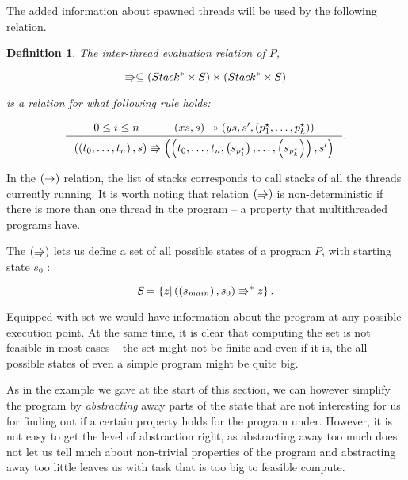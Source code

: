 \documentclass[..thesis.tex]{subfiles}
\newtheorem{defin}{Definition}[section]
\begin{document}

The added information about spawned threads will be used by the following relation.

\begin{defin}

  The inter-thread evaluation relation of $P$, 
 
  \begin{equation*}
    \Rrightarrow \subseteq \left( Stack^\ast \times S \right) \times \left( Stack^\ast \times S \right)
  \end{equation*}

  is a relation for what following rule holds:   

  \begin{equation*}
    \inference{ 0 \leq i \leq n  \separ \lp xs , s \rp \intrathread \lp ys, s', \lp p_1^\star, \ldots, p_k^{\star} \rp \rp}{ \lp \lp t_0, \ldots, t_n \rp, s \rp \interthread  \lp \lp t_0, \ldots, t_n, \lp s_{p_1^{\star}} \rp, \ldots, \lp s_{p_k^{\star}} \rp  \rp , s' \rp} \text{.}
  \end{equation*}

\end{defin}

In the $\left( \Rrightarrow \right)$ relation, the list of stacks corresponds to call stacks of all the threads currently running.
It is worth noting that relation $\left( \Rrightarrow \right)$ is non-deterministic if there is more than one thread in the program -- a property that multithreaded programs have.

The $\left( \Rrightarrow \right)$ lets us define a set of all possible states of a program $P$, with starting state $s_0$ :

\begin{equation*}
\textsl{S} = \left\lbrace  z | \left( \left( s_{main} \right), s_0 \right) \Rrightarrow^{\ast} z \right\rbrace \text{.}
\end{equation*}



Equipped with set \allstates we would have information about the program at any possible execution point. At the same time,
 it is clear that computing the set \allstates is not feasible in most cases -- the set might not be finite and even if it is,
 the all possible states of even a simple program might be quite big.

As in the example we gave at the start of this section, we can however simplify the program by \textit{abstracting} away parts
of the state that are not interesting for us for finding out if a certain property holds for the program under.
However, it is not easy to get the level of abstraction right, as abstracting away too much does not let us tell much about non-trivial properties
of the program and abstracting away too little leaves us with task that is too big to feasible compute.
\end{document}
